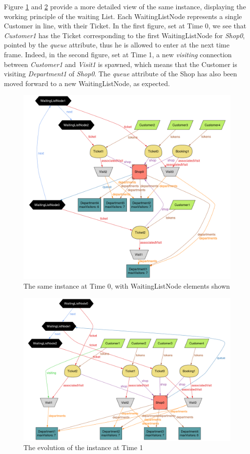 \pagebreak
Figure \ref{fig:waitinglistnode1} and \ref{fig:waitinglistnode2} provide a more detailed view of the same instance, displaying the working principle of the waiting List. Each WaitingListNode represents a single Customer in line, with their Ticket. In the first figure, set at Time 0, we see that \emph{Customer1} has the Ticket corresponding to the first WaitingListNode for \emph{Shop0}, pointed by the \emph{queue} attribute, thus he is allowed to enter at the next time frame.
Indeed, in the second figure, set at Time 1, a new \emph{visiting} connection between \emph{Customer1} and \emph{Visit1} is spawned, which means that the Customer is visiting \emph{Department1} of \emph{Shop0}. The \emph{queue} attribute of the Shop has also been moved forward to a new WaitingListNode, as expected.
\begin{figure}[H]
    \centering
    \includegraphics[width=\textwidth]{Images/Alloy/5Customers_v1_t0_detail_crop.png}
    \caption{The same instance at Time 0, with WaitingListNode elements shown}
    \label{fig:waitinglistnode1}
\end{figure}
\begin{figure}[H]
    \centering
    \includegraphics[width=\textwidth]{Images/Alloy/5Customers_v1_t1_detail_crop.png}
    \caption{The evolution of the instance at Time 1}
    \label{fig:waitinglistnode2}
\end{figure}